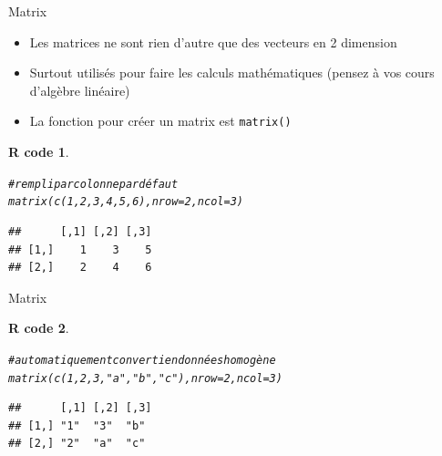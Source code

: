 \documentclass[11pt]{beamer}\usepackage[]{graphicx}\usepackage[]{color}
\makeatletter
\newcommand{\hlnum}[1]{\textcolor[rgb]{0.063,0.58,0.627}{#1}}%
\newcommand{\hlstr}[1]{\textcolor[rgb]{0.063,0.58,0.627}{#1}}%
\newcommand{\hlcom}[1]{\textcolor[rgb]{0.588,0.588,0.588}{#1}}%
\newcommand{\hlstd}[1]{\textcolor[rgb]{0.196,0.196,0.196}{#1}}%
\newcommand{\hlkwc}[1]{\textcolor[rgb]{0,0.631,0.314}{#1}}%
\newcommand{\hlkwd}[1]{\textcolor[rgb]{0.78,0.227,0.412}{#1}}%
\newenvironment{kframe}{%
 \def\at@end@of@kframe{}%
 \ifinner\ifhmode%
  \def\at@end@of@kframe{\end{minipage}}%
  \begin{minipage}{\columnwidth}%
 \fi\fi%
 \def\FrameCommand##1{\hskip\@totalleftmargin \hskip-\fboxsep
 \colorbox{shadecolor}{##1}\hskip-\fboxsep
     \hskip-\linewidth \hskip-\@totalleftmargin \hskip\columnwidth}%
 \MakeFramed {\advance\hsize-\width
   \@totalleftmargin\z@ \linewidth\hsize
   \@setminipage}}%
 {\par\unskip\endMakeFramed%
 \at@end@of@kframe}
\newenvironment{knitrout}{}{} %
\newtheorem{rcode}{R code}[section]
\newcommand{\code}[1]{\texttt{#1}}
\makeatother
\begin{document}
\begin{frame}[fragile]{Matrix}

\begin{itemize}
  \setlength\itemsep{1em}
\item Les matrices ne sont rien d'autre que des vecteurs en 2 dimension
\pause \item Surtout utilisés pour faire les calculs mathématiques (pensez à vos cours d'algèbre linéaire)
\pause \item La fonction pour créer un matrix est \code{matrix()}
\end{itemize}
\pause
\begin{knitrout}
\color{fgcolor}\begin{kframe}
\begin{rcode}\label{unnamed-chunk-19}\begin{alltt}
\hlcom{# rempli par colonne par défaut}
\hlkwd{matrix}\hlstd{(}\hlkwd{c}\hlstd{(}\hlnum{1}\hlstd{,}\hlnum{2}\hlstd{,}\hlnum{3}\hlstd{,}\hlnum{4}\hlstd{,}\hlnum{5}\hlstd{,}\hlnum{6}\hlstd{),} \hlkwc{nrow} \hlstd{=} \hlnum{2}\hlstd{,} \hlkwc{ncol} \hlstd{=} \hlnum{3}\hlstd{)}
\end{alltt}
\begin{verbatim}
##      [,1] [,2] [,3]
## [1,]    1    3    5
## [2,]    2    4    6
\end{verbatim}
\end{rcode}\end{kframe}
\end{knitrout}

\end{frame}


\begin{frame}[fragile]{Matrix}

\begin{knitrout}
\color{fgcolor}\begin{kframe}
\begin{rcode}\label{unnamed-chunk-20}\begin{alltt}
\hlcom{# automatiquement converti en données homogène}
\hlkwd{matrix}\hlstd{(}\hlkwd{c}\hlstd{(}\hlnum{1}\hlstd{,}\hlnum{2}\hlstd{,}\hlnum{3}\hlstd{,}\hlstr{"a"}\hlstd{,}\hlstr{"b"}\hlstd{,}\hlstr{"c"}\hlstd{),} \hlkwc{nrow} \hlstd{=} \hlnum{2}\hlstd{,} \hlkwc{ncol} \hlstd{=} \hlnum{3}\hlstd{)}
\end{alltt}
\begin{verbatim}
##      [,1] [,2] [,3]
## [1,] "1"  "3"  "b" 
## [2,] "2"  "a"  "c"
\end{verbatim}
\end{rcode}\end{kframe}
\end{knitrout}

\end{frame}
\end{document}
